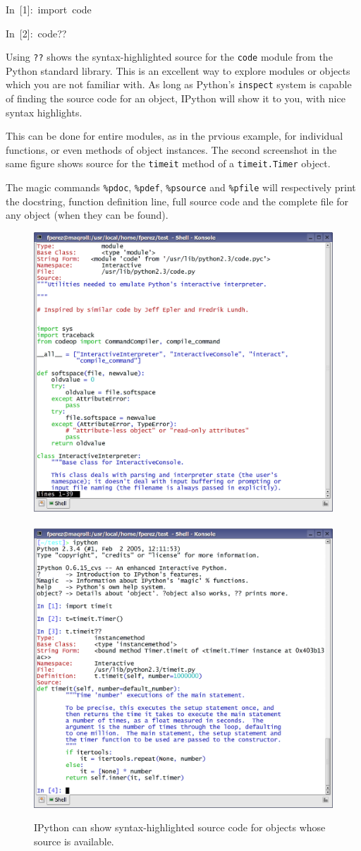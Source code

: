 \begin{lyxcode}
In~{[}1]:~import~code

In~{[}2]:~code??
\end{lyxcode}
Using \texttt{??} shows the syntax-highlighted source for the \texttt{code}
module from the Python standard library. This is an excellent way
to explore modules or objects which you are not familiar with. As
long as Python's \texttt{inspect} system is capable of finding the
source code for an object, IPython will show it to you, with nice
syntax highlights. 

This can be done for entire modules, as in the prvious example, for
individual functions, or even methods of object instances. The second
screenshot in the same figure shows source for the \texttt{timeit}
method of a \texttt{timeit.Timer} object.

The magic commands \texttt{\%pdoc}, \texttt{\%pdef}, \texttt{\%psource}
and \texttt{\%pfile} will respectively print the docstring, function
definition line, full source code and the complete file for any object
(when they can be found).

%
\begin{figure}
\begin{centering}
\includegraphics[width=0.48\linewidth]{fig/ipscr_code}~\includegraphics[width=0.48\linewidth]{fig/ipscr_meth_src}
\par\end{centering}

\caption{\label{fig:ipscr_code}IPython can show syntax-highlighted source
code for objects whose source is available.}

\end{figure}



